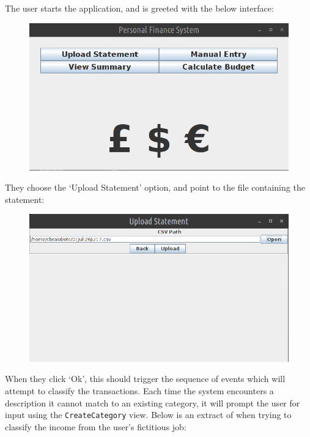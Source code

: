 The user starts the application, and is greeted with the below interface:
\begin{figure}[ht!]
  \begin{center}
    \includegraphics[width=14cm]{./contents/img/home_screen.png}
  \end{center}
  \caption{}
\end{figure}
\FloatBarrier

They choose the `Upload Statement' option, and point to the file containing the
statement:
\begin{figure}[ht!]
  \begin{center}
    \includegraphics[width=14cm]{./contents/img/upload_statement.png}
  \end{center}
  \caption{}
\end{figure}
\FloatBarrier

When they click `Ok', this should trigger the sequence of events which will
attempt to classify the transactions. Each time the system encounters a
description it cannot match to an existing category, it will prompt the user
for input using the \texttt{CreateCategory} view. Below is an extract of when
trying to classify the income from the user's fictitious job:

